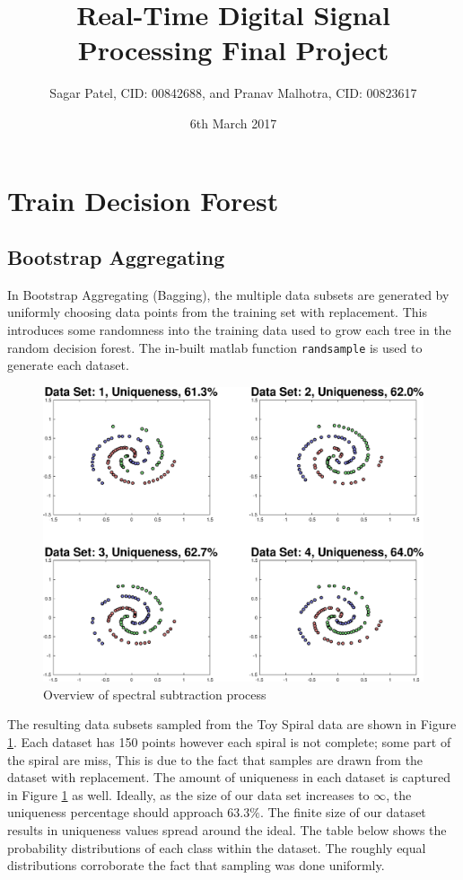 \documentclass[a4paper,pra,twocolumn,10pt,aps,longbibliography,nobalancelastpage]{revtex4-1}
\begin{document}
\title{Real-Time Digital Signal Processing Final Project}
\author{Sagar Patel, CID: 00842688, and Pranav Malhotra, CID: 00823617}
\date{6th March 2017}

\maketitle
\section{Train Decision Forest}
\subsection{Bootstrap Aggregating}
In Bootstrap Aggregating (Bagging), the multiple data subsets are generated by uniformly choosing data points from the training set with replacement. This introduces some randomness into the
training data used to grow each tree in the random decision forest. The in-built matlab function \texttt{randsample} is used to generate each dataset. 
\begin{figure}[H]
	\centering
    \includegraphics[width=0.60\columnwidth]{boot_strap}
    \caption{Overview of spectral subtraction process}
    \label{fig:boot_strap}
\end{figure}

The resulting data subsets sampled from the Toy Spiral data are shown in Figure \ref{fig:boot_strap}. Each dataset has 150 points however each spiral is not complete; some part of the spiral are miss, This is due to the fact that samples are drawn from the dataset with replacement. The amount of uniqueness in each dataset is captured in Figure \ref{fig:boot_strap} as well.  Ideally, as the size of our data set increases to $\infty$, the uniqueness percentage should approach $63.3\%$. The finite size of our dataset results in uniqueness values spread around the ideal. The table below shows the probability distributions of each class within the dataset. The roughly equal distributions corroborate the fact that sampling was done uniformly.
\end{document}
